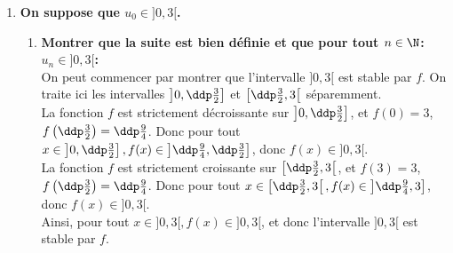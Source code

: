 \documentclass[a4paper, 11pt]{article}
\begin{document}
\begin{correction}
\begin{enumerate}
\begin{itemize}
\end{itemize}
\item \textbf{On suppose que $u_0\in\rbrack 0,3\lbrack$.}
\begin{enumerate}
\item \textbf{Montrer que la suite est bien d\'efinie et que pour tout $n\in\N$: $u_n\in\rbrack 0,3\lbrack$:}\\
\noindent 
On peut commencer par montrer que l'intervalle $\rbrack 0,3\lbrack$ est stable par $f$. On traite ici les intervalles $\left\rbrack 0,\ddp\frac{3}{2}\right\rbrack$ et  $\left\lbrack \ddp\frac{3}{2},3\right\lbrack$ s\'eparemment.\\
La fonction $f$ est strictement d\'ecroissante sur $\left\rbrack 0,\ddp\frac{3}{2}\right\rbrack$, et $f( 0)=3$, $f\left( \ddp\frac{3}{2}\right)=\ddp\frac{9}{4}$. Donc pour tout $x \in \left\rbrack 0,\ddp\frac{3}{2}\right\rbrack, f(x) \in \left\rbrack \ddp \frac{9}{4},\ddp\frac{3}{2}\right\rbrack$, donc $f(x) \in \rbrack 0,3\lbrack$.\\
La fonction $f$ est strictement croissante sur $\left\lbrack \ddp\frac{3}{2},3\right\lbrack$, et $f\left(3\right)=3$, $f\left( \ddp\frac{3}{2}\right)=\ddp\frac{9}{4}$. Donc pour tout $x \in \left\lbrack \ddp\frac{3}{2},3\right\lbrack, f(x) \in \left\rbrack \ddp \frac{9}{4},3\right\rbrack$, donc $f(x) \in \rbrack 0,3\lbrack$.\\
Ainsi, pour tout $x \in \rbrack 0,3\lbrack, f(x) \in \rbrack 0,3\lbrack$, et donc l'intervalle $\rbrack 0,3\lbrack$ est stable par $f$.\\

\end{enumerate}
\end{enumerate}
\end{correction}
\end{document}
